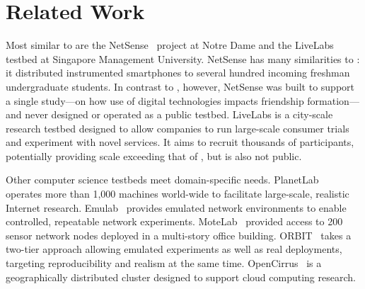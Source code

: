 \section{Related Work}
\label{sec:related}

Most similar to \PhoneLab{} are the NetSense~\cite{netsense-hotplanet}
project at Notre Dame and the LiveLabs~\cite{livelabs-url} testbed at
Singapore Management University. NetSense has many similarities to
\PhoneLab{}: it distributed instrumented smartphones to several hundred
incoming freshman undergraduate students. In contrast to \PhoneLab{},
however, NetSense was built to support a single study---on how use of digital
technologies impacts friendship formation---and never designed or operated as
a public testbed. LiveLabs is a city-scale research testbed designed to allow
companies to run large-scale consumer trials and experiment with novel
services. It aims to recruit thousands of participants, potentially providing
scale exceeding that of \PhoneLab{}, but is also not public.

Other computer science testbeds meet domain-specific needs.
PlanetLab~\cite{peterson:ccr:2003} operates more than 1,000 machines
world-wide to facilitate large-scale, realistic Internet research.
Emulab~\cite{white:osdi:2002} provides emulated network environments to
enable controlled, repeatable network experiments.
MoteLab~\cite{werner-allen:ipsn:2005} provided access to 200 sensor network
nodes deployed in a multi-story office building.
ORBIT~\cite{raychaudhuri:tridentcom:2005} takes a two-tier approach allowing
emulated experiments as well as real deployments, targeting reproducibility
and realism at the same time. OpenCirrus~\cite{avetisyan:computer:2010} is a
geographically distributed cluster designed to support cloud computing
research.
